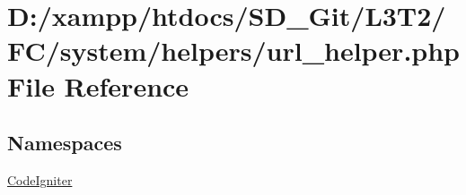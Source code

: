 \hypertarget{url__helper_8php}{}\section{D\+:/xampp/htdocs/\+S\+D\+\_\+\+Git/\+L3\+T2/\+F\+C/system/helpers/url\+\_\+helper.php File Reference}
\label{url__helper_8php}
\subsection*{Namespaces}
\begin{DoxyCompactItemize}
\item 
 \hyperlink{namespace_code_igniter}{Code\+Igniter}
\end{DoxyCompactItemize}
